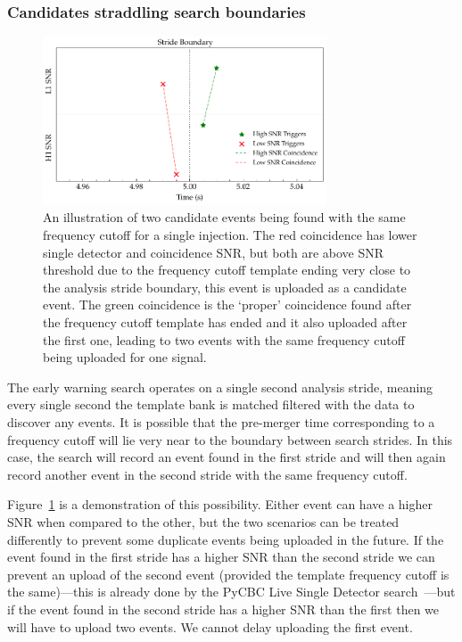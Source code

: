 \subsubsection{\label{6:sec:cands-across-bounds}Candidates straddling search boundaries}
%
\begin{figure}
       \centering
    \includegraphics[width=0.75\textwidth]{images/6_earlywarning/identified-problems/cands_across_bounds.pdf}
    \caption{An illustration of two candidate events being found with the same frequency cutoff for a single injection. The red coincidence has lower single detector and coincidence SNR, but both are above SNR threshold due to the frequency cutoff template ending very close to the analysis stride boundary, this event is uploaded as a candidate event. The green coincidence is the `proper' coincidence found after the frequency cutoff template has ended and it also uploaded after the first one, leading to two events with the same frequency cutoff being uploaded for one \gwadj signal.}
    \label{6:fig:candidates_across_boundaries}
\end{figure}
%

The early warning search operates on a single second analysis stride, meaning every single second the template bank is matched filtered with the data to discover any \gwadj events. It is possible that the pre-merger time corresponding to a frequency cutoff will lie very near to the boundary between search strides. In this case, the search will record an event found in the first stride and will then again record another event in the second stride with the same frequency cutoff.

Figure~\ref{6:fig:candidates_across_boundaries} is a demonstration of this possibility. Either event can have a higher SNR when compared to the other, but the two scenarios can be treated differently to prevent some duplicate events being uploaded in the future. If the event found in the first stride has a higher SNR than the second stride we can prevent an upload of the second event (provided the template frequency cutoff is the same)---this is already done by the PyCBC Live Single Detector search~\cite{PyCBC_singles:2022}---but if the event found in the second stride has a higher SNR than the first then we will have to upload two events. We cannot delay uploading the first event.


